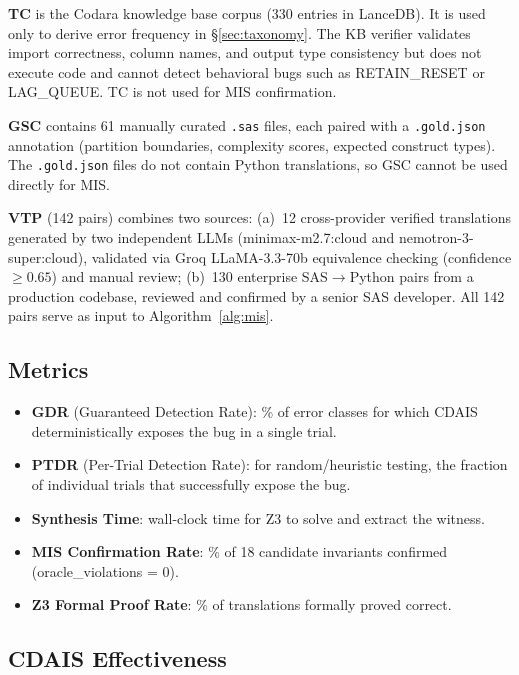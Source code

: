 \documentclass[conference]{IEEEtran}
\begin{document}
\textbf{TC} is the Codara knowledge base corpus (330 entries in LanceDB). It is used
only to derive error frequency in \S\ref{sec:taxonomy}. The KB verifier validates
import correctness, column names, and output type consistency but does not execute
code and cannot detect behavioral bugs such as RETAIN\_RESET or LAG\_QUEUE. TC is
not used for MIS confirmation.

\textbf{GSC} contains 61 manually curated \texttt{.sas} files, each paired with a
\texttt{.gold.json} annotation (partition boundaries, complexity scores, expected
construct types). The \texttt{.gold.json} files do not contain Python translations, so
GSC cannot be used directly for MIS.

\textbf{VTP} (142 pairs) combines two sources: (a)~12 cross-provider verified
translations generated by two independent LLMs (minimax-m2.7:cloud and
nemotron-3-super:cloud), validated via Groq LLaMA-3.3-70b equivalence checking
(confidence $\geq 0.65$) and manual review; (b)~130 enterprise
SAS$\rightarrow$Python pairs from a production codebase, reviewed and confirmed
by a senior SAS developer. All 142 pairs serve as input to
Algorithm~\ref{alg:mis}.

\subsection{Metrics}

\begin{itemize}
  \item \textbf{GDR} (Guaranteed Detection Rate): \% of error classes for which
        CDAIS deterministically exposes the bug in a single trial.
  \item \textbf{PTDR} (Per-Trial Detection Rate): for random/heuristic testing, the
        fraction of individual trials that successfully expose the bug.
  \item \textbf{Synthesis Time}: wall-clock time for Z3 to solve and extract the witness.
  \item \textbf{MIS Confirmation Rate}: \% of 18 candidate invariants confirmed
        (oracle\_violations = 0).
  \item \textbf{Z3 Formal Proof Rate}: \% of translations formally proved correct.
\end{itemize}

\subsection{CDAIS Effectiveness}
\end{document}
